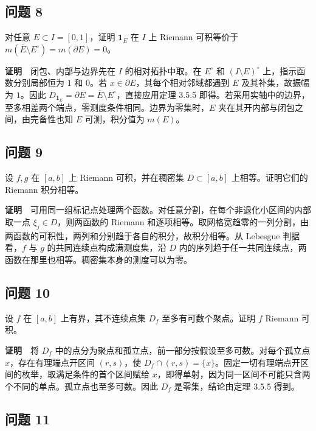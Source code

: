 \documentclass[11pt,a4paper]{article}
\begin{document}
\subsection{问题 8}\label{ux95eeux9898-8}

对任意 \(E\subset I=[0,1]\)，证明 \(\mathbf1_E\) 在 \(I\) 上 Riemann
可积等价于 \(m(\overline E\setminus E^\circ)=m(\partial E)=0\)。

\textbf{证明}　闭包、内部与边界先在 \(I\) 的相对拓扑中取。在 \(E^\circ\)
和 \((I\setminus E)^\circ\) 上，指示函数分别局部恒为 \(1\) 和 \(0\)。若
\(x\in\partial E\)，其每个相对邻域都遇到 \(E\) 及其补集，故振幅为
\(1\)。因此
\(D_{\mathbf1_E}=\partial E=\overline E\setminus E^\circ\)，直接应用定理
3.5.5
即得。若采用实轴中的边界，至多相差两个端点，零测度条件相同。边界为零集时，\(E\)
夹在其开内部与闭包之间，由完备性也知 \(E\) 可测，积分值为 \(m(E)\)。

\subsection{问题 9}\label{ux95eeux9898-9}

设 \(f,g\) 在 \([a,b]\) 上 Riemann 可积，并在稠密集 \(D\subset[a,b]\)
上相等。证明它们的 Riemann 积分相等。

\textbf{证明}　可用同一组标记点处理两个函数。对任意分割，在每个非退化小区间的内部取一点
\(\xi_j\in D\)，则两函数的 Riemann
和逐项相等。取网格宽趋零的一列分割，由两函数的可积性，两列和分别趋于各自的积分，故积分相等。从
Lebesgue 判据看，\(f\) 与 \(g\) 的共同连续点构成满测度集，沿 \(D\)
内的序列趋于任一共同连续点，两函数在那里也相等。稠密集本身的测度可以为零。

\subsection{问题 10}\label{ux95eeux9898-10}

设 \(f\) 在 \([a,b]\) 上有界，其不连续点集 \(D_f\)
至多有可数个聚点。证明 \(f\) Riemann 可积。

\textbf{证明}　将 \(D_f\)
中的点分为聚点和孤立点，前一部分按假设至多可数。对每个孤立点
\(x\)，存在有理端点开区间 \((r,s)\)，使
\(D_f\cap(r,s)=\{x\}\)。固定一切有理端点开区间的枚举，取满足条件的首个区间赋给
\(x\)，即得单射，因为同一区间不可能只含两个不同的单点。孤立点也至多可数。因此
\(D_f\) 是零集，结论由定理 3.5.5 得到。

\subsection{问题 11}\label{ux95eeux9898-11}
\end{document}
